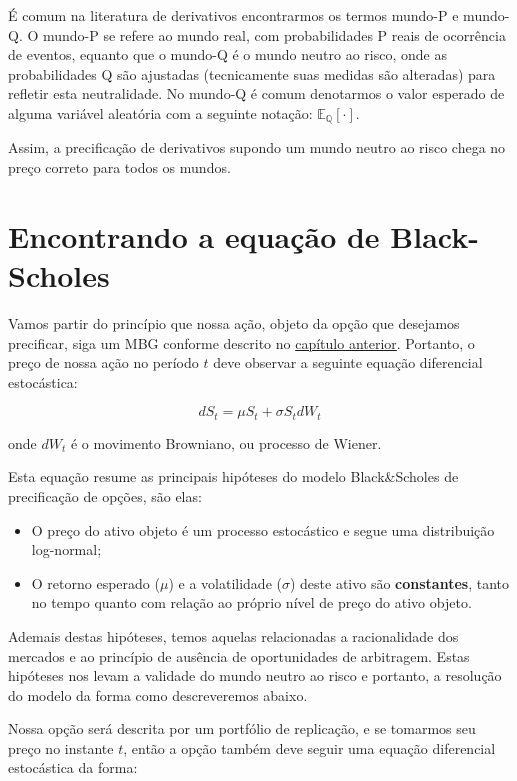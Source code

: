 \documentclass[]{book}
\providecommand{\tightlist}{%
  \setlength{\itemsep}{0pt}\setlength{\parskip}{0pt}}
\theoremstyle{definition}
\theoremstyle{definition}
\theoremstyle{definition}
\theoremstyle{remark}
\begin{document}
É comum na literatura de derivativos encontrarmos os termos mundo-P e
mundo-Q. O mundo-P se refere ao mundo real, com probabilidades P reais
de ocorrência de eventos, equanto que o mundo-Q é o mundo neutro ao
risco, onde as probabilidades Q são ajustadas (tecnicamente suas medidas
são alteradas) para refletir esta neutralidade. No mundo-Q é comum
denotarmos o valor esperado de alguma variável aleatória com a seguinte
notação: \(\mathbb{E_Q}[\cdot]\).

Assim, a precificação de derivativos supondo um mundo neutro ao risco
chega no preço correto para todos os mundos.

\section{Encontrando a equação de
Black-Scholes}\label{encontrando-a-equacao-de-black-scholes}

Vamos partir do princípio que nossa ação, objeto da opção que desejamos
precificar, siga um MBG conforme descrito no
\protect\hyperlink{processos-estocasticos}{capítulo anterior}. Portanto,
o preço de nossa ação no período \(t\) deve observar a seguinte equação
diferencial estocástica:

\begin{equation}
dS_t=\mu S_t+\sigma S_t dW_t 
\label{eq:ds}
\end{equation}

onde \(dW_t\) é o movimento Browniano, ou processo de Wiener.

Esta equação resume as principais hipóteses do modelo Black\&Scholes de
precificação de opções, são elas:

\begin{itemize}
\tightlist
\item
  O preço do ativo objeto é um processo estocástico e segue uma
  distribuição log-normal;
\item
  O retorno esperado (\(\mu\)) e a volatilidade (\(\sigma\)) deste ativo
  são \textbf{constantes}, tanto no tempo quanto com relação ao próprio
  nível de preço do ativo objeto.
\end{itemize}

Ademais destas hipóteses, temos aquelas relacionadas a racionalidade dos
mercados e ao princípio de ausência de oportunidades de arbitragem.
Estas hipóteses nos levam a validade do mundo neutro ao risco e
portanto, a resolução do modelo da forma como descreveremos abaixo.

Nossa opção será descrita por um portfólio de replicação, e se tomarmos
seu preço no instante \(t\), então a opção também deve seguir uma
equação diferencial estocástica da forma:
\end{document}
